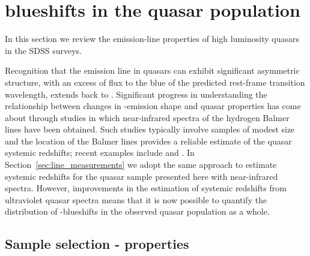 \section{ blueshifts in the quasar population}
\label{sec:blueshifts}

In this section we review the  emission-line properties of high luminosity quasars in the SDSS surveys. 

Recognition that the  emission line in quasars can exhibit significant asymmetric structure, with an excess of flux to the blue of the predicted rest-frame transition wavelength, extends back to \citet{gaskell82}. 
Significant progress in understanding the relationship between changes in -emission shape and quasar properties has come about through studies in which near-infrared spectra of the hydrogen Balmer lines have been obtained. 
Such studies typically involve samples of modest size and the location of the Balmer lines provides a reliable estimate of the quasar systemic redshifts; recent examples include \citet{shen12} and \citet{marziani16}. 
In Section~\ref{sec:line_measurements} we adopt the same approach to estimate systemic redshifts for the quasar sample presented here with near-infrared spectra.  
However, improvements in the estimation of systemic redshifts from ultraviolet quasar spectra means that it is now possible to quantify the distribution of -blueshifts in the observed quasar population as a whole. 


\subsection{Sample selection -  properties}

